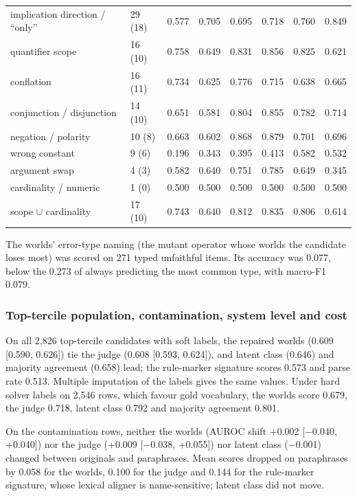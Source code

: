 \documentclass[11pt,letterpaper]{article}
\begin{document}
{\begin{longtable}
{}implication direction / ``only'' & 29 (18) & 0.577 & 0.705 & 0.695 & 0.718 & 0.760 & 0.849 \\
{}quantifier scope & 16 (10) & 0.758 & 0.649 & 0.831 & 0.856 & 0.825 & 0.621 \\
{}conflation & 16 (11) & 0.734 & 0.625 & 0.776 & 0.715 & 0.638 & 0.665 \\
{}conjunction / disjunction & 14 (10) & 0.651 & 0.581 & 0.804 & 0.855 & 0.782 & 0.714 \\
{}negation / polarity & 10 (8) & 0.663 & 0.602 & 0.868 & 0.879 & 0.701 & 0.696 \\
{}wrong constant & 9 (6) & 0.196 & 0.343 & 0.395 & 0.413 & 0.582 & 0.532 \\
{}argument swap & 4 (3) & 0.582 & 0.640 & 0.751 & 0.785 & 0.649 & 0.345 \\
{}cardinality / numeric & 1 (0) & 0.500 & 0.500 & 0.500 & 0.500 & 0.500 & 0.500 \\
{}scope $\cup$ cardinality & 17 (10) & 0.743 & 0.640 & 0.812 & 0.835 & 0.806 & 0.614 \\
\end{longtable}
}

The worlds' error-type naming (the mutant operator whose worlds the candidate loses most) was scored on 271 typed unfaithful items. Its accuracy was 0.077, below the 0.273 of always predicting the most common type, with macro-F1 0.079.

\subsubsection{Top-tercile population, contamination, system level and cost}

On all 2,826 top-tercile candidates with soft labels, the repaired worlds (0.609 [0.590, 0.626]) tie the judge (0.608 [0.593, 0.624]), and latent class (0.646) and majority agreement (0.658) lead; the rule-marker signature scores 0.573 and parse rate 0.513. Multiple imputation of the labels gives the same values. Under hard solver labels on 2,546 rows, which favour gold vocabulary, the worlds score 0.679, the judge 0.718, latent class 0.792 and majority agreement 0.801.

On the contamination rows, neither the worlds (AUROC shift +0.002 [$-$0.040, +0.040]) nor the judge (+0.009 [$-$0.038, +0.055]) nor latent class ($-$0.001) changed between originals and paraphrases. Mean scores dropped on paraphrases by 0.058 for the worlds, 0.100 for the judge and 0.144 for the rule-marker signature, whose lexical aligner is name-sensitive; latent class did not move.
\end{document}
